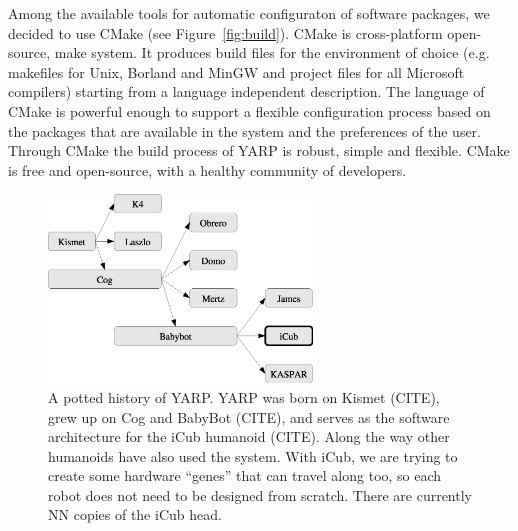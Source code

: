 Among the available tools for automatic configuraton of 
software packages, we decided to use CMake
(see Figure~\ref{fig:build}). CMake is 
cross-platform open-source, make system. It produces 
build files for the environment of choice (e.g. makefiles
for Unix, Borland and MinGW and project files for all 
Microsoft compilers) starting from a language independent 
description. The language of CMake is powerful enough
to support a flexible configuration process based 
on the packages that are available in the system and 
the preferences of the user. Through 
CMake the build process of YARP is robust, simple and 
flexible.
%
%
%
CMake is free and open-source, with a healthy community of 
developers.





\begin{figure}[t]
\begin{center}
\includegraphics[height=5cm]{fig-family}
\caption{
%
\label{fig:family}
%
A potted history of YARP.  YARP was born on Kismet (CITE),
grew up on Cog and BabyBot (CITE), and serves as the
software architecture for the iCub humanoid (CITE).
%
Along the way other humanoids have also used the system.
%
With iCub, we are trying to create some hardware ``genes''
that can travel along too, so each robot does not need to
be designed from scratch.
%
There are currently NN copies of the iCub head.
%
%
}
\end{center}
\end{figure}



